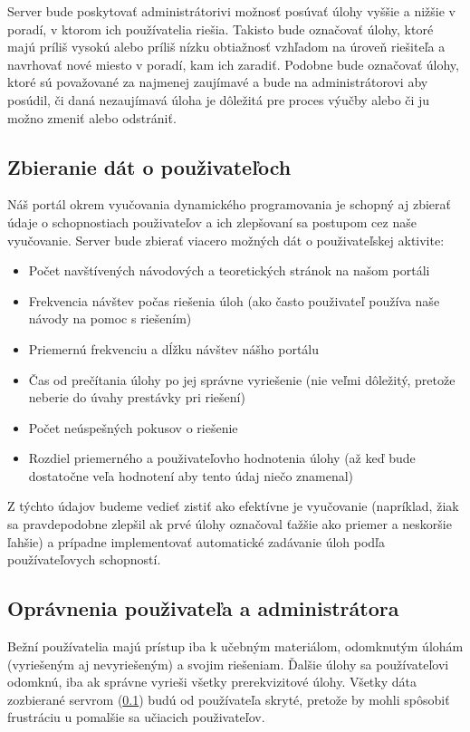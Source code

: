 Server bude poskytovať administrátorivi možnosť posúvať úlohy vyššie a nižšie v poradí, v ktorom ich používatelia riešia. Takisto bude označovať úlohy, ktoré majú príliš vysokú alebo príliš nízku obtiažnosť vzhľadom na úroveň riešiteľa a navrhovať nové miesto v poradí, kam ich zaradiť. Podobne bude označovať úlohy, ktoré sú považované za najmenej zaujímavé a bude na administrátorovi aby posúdil, či daná nezaujímavá úloha je dôležitá pre proces výučby alebo či ju možno zmeniť alebo odstrániť.
\subsection{Zbieranie dát o použivateľoch}
\label{zbieraniedata}
Náš portál okrem vyučovania dynamického programovania je schopný aj zbierať údaje o schopnostiach použivateľov a ich zlepšovaní sa postupom cez naše vyučovanie. Server bude zbierať viacero možných dát o použivateľskej aktivite:
\begin{itemize}
\item Počet navštívených návodových a teoretických stránok na našom portáli
\item Frekvencia návštev počas riešenia úloh (ako často použivateľ používa naše návody na pomoc s riešením)
\item Priemernú frekvenciu a dĺžku návštev nášho portálu
\item Čas od prečítania úlohy po jej správne vyriešenie (nie veľmi dôležitý, pretože neberie do úvahy prestávky pri riešení)
\item Počet neúspešných pokusov o riešenie
\item Rozdiel priemerného a použivateľovho hodnotenia úlohy (až keď bude dostatočne veľa hodnotení aby tento údaj niečo znamenal)
\end{itemize}

Z týchto údajov budeme vedieť zistiť ako efektívne je vyučovanie (napríklad, žiak sa pravdepodobne zlepšil ak prvé úlohy označoval ťažšie ako priemer a neskoršie ľahšie) a prípadne implementovať automatické zadávanie úloh podľa používateľovych schopností.

\subsection{Oprávnenia použivateľa a administrátora}
Bežní používatelia majú prístup iba k učebným materiálom, odomknutým úlohám (vyriešeným aj nevyriešeným) a svojim riešeniam. Ďalšie úlohy sa používateľovi odomknú, iba ak správne vyrieši všetky prerekvizitové úlohy. Všetky dáta zozbierané servrom (\ref{zbieraniedata}) budú od používateľa skryté, pretože by mohli spôsobiť frustráciu u pomalšie sa učiacich použivateľov.

